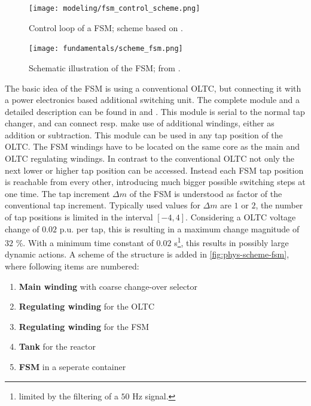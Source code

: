 \begin{figure}[htb!]
    \centering
    \texttt{[image: modeling/fsm\_control\_scheme.png]}
    \caption[Control loop of a \acf{FSM}]{Control loop of a \acs{FSM}; scheme based on \textcite{burlakin_2024}.}
    \label{fig:fsm-control-loop}
\end{figure}

\begin{figure} 
    \centering
    \texttt{[image: fundamentals/scheme\_fsm.png]}
    \caption[Schematic illustration of the \acs{FSM}]{Schematic illustration of the \acs{FSM}; from \autocite{burlakin_2024a}.}
    \label{fig:phys-scheme-fsm}
\end{figure}
The basic idea of the \acs{FSM} is using a conventional \acs{OLTC}, but connecting it with a power electronics based additional switching unit.
The complete module and a detailed description can be found in \autocite{burlakin_2024a} and \autocite{maschinenfabrikreinhausengmbh_2023}.
This module is serial to the normal tap changer, and can connect resp. make use of additional windings, either as addition or subtraction.
This module can be used in any tap position of the \acs{OLTC}.
The \acs{FSM} windings have to be located on the same core as the main and \acs{OLTC} regulating windings.
In contrast to the conventional \acs{OLTC} not only the next lower or higher tap position can be accessed.
Instead each \acs{FSM} tap position is reachable from every other, introducing much bigger possible switching steps at one time.
The tap increment $\Delta m$ of the \acs{FSM} is understood as factor of the conventional tap increment.
Typically used values for $\Delta m$ are $1$ or $2$, the number of tap positions is limited in the interval $[-4,4]$.
Considering a \acs{OLTC} voltage change of $0.02$ p.u. per tap, this is resulting in a maximum change magnitude of $32$ \%.
With a minimum time constant of $0.02$ s\footnote{limited by the filtering of a $50$ Hz signal.}, this results in possibly large dynamic actions.
A scheme of the structure is added in \autoref{fig:phys-scheme-fsm}, where following items are numbered:
\begin{enumerate}[label=\protect\circled{\arabic*}]
    \item \textbf{Main winding} with coarse change-over selector
    \item \textbf{Regulating winding} for the \acs{OLTC}
    \item \textbf{Regulating winding} for the \acs{FSM}
    \item \textbf{Tank} for the reactor
    \item \textbf{\acs{FSM}} in a seperate container
\end{enumerate}

